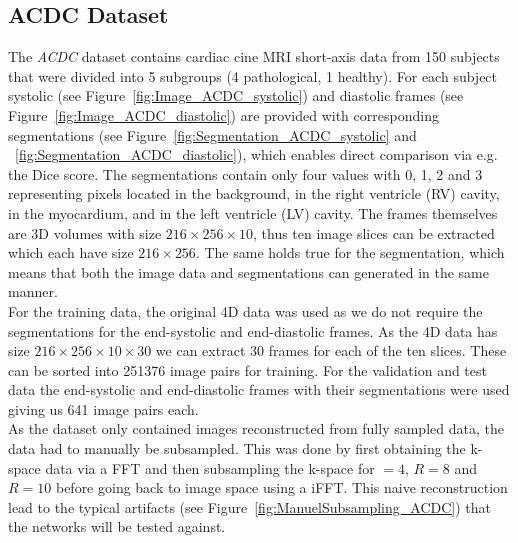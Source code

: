 \subsection{ACDC Dataset} \label{SubSec:ACDC}
The \emph{ACDC} dataset contains cardiac cine MRI short-axis data from 150 subjects that were divided into 5 subgroups (4 pathological, 1 healthy). For each subject systolic (see Figure~\ref{fig:Image_ACDC_systolic}) and diastolic frames (see Figure~\ref{fig:Image_ACDC_diastolic}) are provided with corresponding segmentations (see Figure~\ref{fig:Segmentation_ACDC_systolic} and ~\ref{fig:Segmentation_ACDC_diastolic}), which enables direct comparison via e.g. the Dice score. The segmentations contain only four values with 0, 1, 2 and 3 representing pixels located in the background, in the right ventricle (RV) cavity, in the myocardium, and in the left ventricle (LV) cavity. The frames themselves are 3D volumes with size $216 \times 256 \times 10$, thus ten image slices can be extracted which each have size $216 \times 256$. The same holds true for the segmentation, which means that both the image data and segmentations can generated in the same manner.\\
For the training data, the original 4D data was used as we do not require the segmentations for the end-systolic and end-diastolic frames. As the 4D data has size $216 \times 256 \times 10 \times 30$ we can extract 30 frames for each of the ten slices. These can be sorted into 251376 image pairs for training. For the validation and test data the end-systolic and end-diastolic frames with their segmentations were used giving us 641 image pairs each.\\
As the dataset only contained images reconstructed from fully sampled data, the data had to manually be subsampled. This was done by first obtaining the k-space data via a FFT and then subsampling the k-space for $=4$, $R=8$ and $R=10$ before going back to image space using a iFFT. This naive reconstruction lead to the typical artifacts (see Figure~\ref{fig:ManuelSubsampling_ACDC}) that the networks will be tested against.

